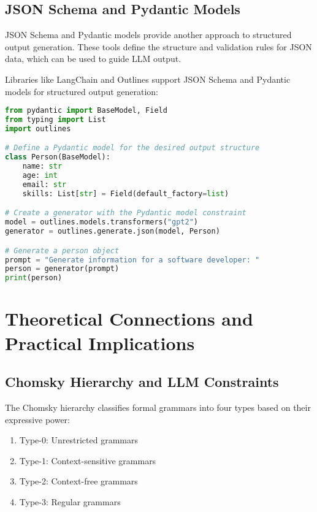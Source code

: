 \documentclass{article}
\begin{document}
\subsection{JSON Schema and Pydantic Models}

JSON Schema and Pydantic models provide another approach to structured output generation. These tools define the structure and validation rules for JSON data, which can be used to guide LLM output.

Libraries like LangChain and Outlines support JSON Schema and Pydantic models for structured output generation:

\begin{lstlisting}[language=Python, caption=Using Pydantic for structured output]
from pydantic import BaseModel, Field
from typing import List
import outlines

# Define a Pydantic model for the desired output structure
class Person(BaseModel):
    name: str
    age: int
    email: str
    skills: List[str] = Field(default_factory=list)

# Create a generator with the Pydantic model constraint
model = outlines.models.transformers("gpt2")
generator = outlines.generate.json(model, Person)

# Generate a person object
prompt = "Generate information for a software developer: "
person = generator(prompt)
print(person)
\end{lstlisting}

\section{Theoretical Connections and Practical Implications}

\subsection{Chomsky Hierarchy and LLM Constraints}

The Chomsky hierarchy classifies formal grammars into four types based on their expressive power:
\begin{enumerate}
    \item Type-0: Unrestricted grammars
    \item Type-1: Context-sensitive grammars
    \item Type-2: Context-free grammars
    \item Type-3: Regular grammars
\end{enumerate}
\end{document}
